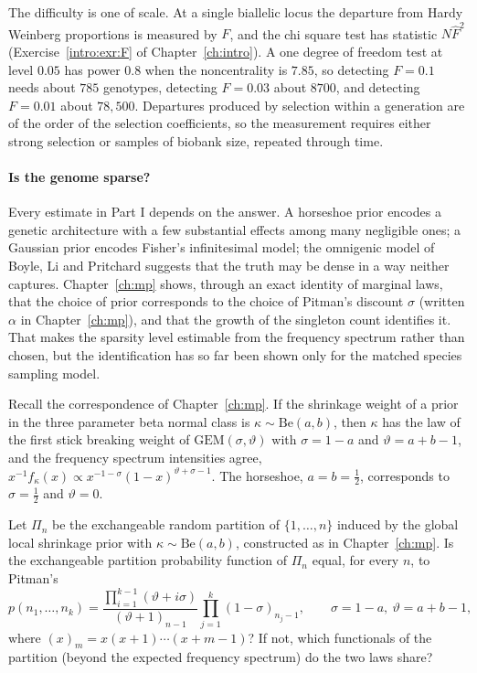 The difficulty is one of scale. At a single biallelic locus the departure from Hardy Weinberg
proportions is measured by $F$, and the chi square test has statistic $N\hat F^2$ (Exercise~\ref{intro:exr:F} of
Chapter~\ref{ch:intro}). A one degree of freedom test at level $0.05$ has power $0.8$ when the
noncentrality is $7.85$, so detecting $F=0.1$ needs about $785$ genotypes, detecting $F=0.03$
about $8700$, and detecting $F=0.01$ about $78{,}500$. Departures produced by selection within a
generation are of the order of the selection coefficients, so the measurement requires either
strong selection or samples of biobank size, repeated through time.

\paragraph{Is the genome sparse?} Every estimate in Part I depends on the answer. A horseshoe prior
encodes a genetic architecture with a few substantial effects among many negligible ones; a
Gaussian prior encodes Fisher's infinitesimal model; the omnigenic model of Boyle, Li and Pritchard
suggests that the truth may be dense in a way neither captures. Chapter~\ref{ch:mp} shows, through an exact identity of marginal laws, that the
choice of prior corresponds to the choice of Pitman's discount $\sigma$ (written $\alpha$ in Chapter~\ref{ch:mp}), and that the growth of the
singleton count identifies it. That makes the sparsity level estimable from the frequency
spectrum rather than chosen, but the identification has so far been shown only for the matched
species sampling model.

Recall the correspondence of Chapter~\ref{ch:mp}. If the shrinkage weight of a prior in the three
parameter beta normal class is $\kappa\sim\mathrm{Be}(a,b)$, then $\kappa$ has the law of the
first stick breaking weight of $\mathrm{GEM}(\sigma,\vartheta)$ with $\sigma=1-a$ and
$\vartheta=a+b-1$, and the frequency spectrum intensities agree, $x^{-1}f_\kappa(x)\propto
x^{-1-\sigma}(1-x)^{\vartheta+\sigma-1}$. The horseshoe, $a=b=\tfrac12$, corresponds to
$\sigma=\tfrac12$ and $\vartheta=0$.

\begin{question}\label{future:q:mp}
Let $\Pi_n$ be the exchangeable random partition of $\{1,\dots,n\}$ induced by the global local
shrinkage prior with $\kappa\sim\mathrm{Be}(a,b)$, constructed as in Chapter~\ref{ch:mp}. Is the
exchangeable partition probability function of $\Pi_n$ equal, for every $n$, to Pitman's
\begin{equation*}
p(n_1,\dots,n_k)=\frac{\prod_{i=1}^{k-1}(\vartheta+i\sigma)}{(\vartheta+1)_{n-1}}
\prod_{j=1}^{k}(1-\sigma)_{n_j-1},
\qquad \sigma=1-a,\ \vartheta=a+b-1,
\end{equation*}
where $(x)_m=x(x+1)\cdots(x+m-1)$? If not, which functionals of the partition (beyond the
expected frequency spectrum) do the two laws share?
\end{question}

